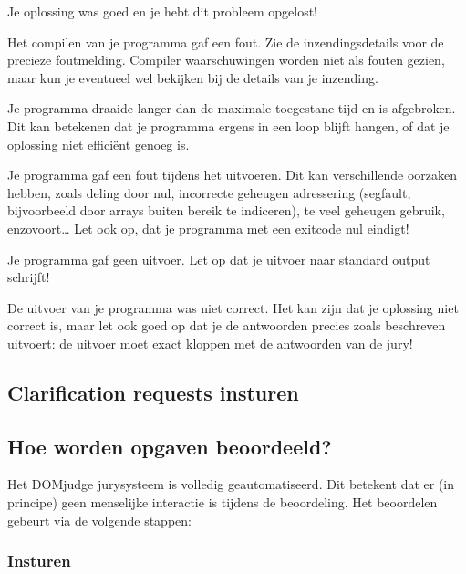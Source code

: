 \documentclass[11pt,titlepage,a4paper]{article}
\newcommand{\DOMjudge}{DOMjudge }
\begin{document}
\begin{description}[\setleftmargin{4.5cm}]
\item[CORRECT]
Je oplossing was goed en je hebt dit probleem opgelost!

\item[COMPILER-ERROR]
Het compilen van je programma gaf een fout. Zie de inzendingsdetails
voor de precieze foutmelding. Compiler waarschuwingen worden niet als
fouten gezien, maar kun je eventueel wel bekijken bij de details van
je inzending.

\item[TIMELIMIT]
Je programma draaide langer dan de maximale toegestane tijd en is
afgebroken. Dit kan betekenen dat je programma ergens in een loop
blijft hangen, of dat je oplossing niet effici\"ent genoeg is.

\item[RUN-ERROR]
Je programma gaf een fout tijdens het uitvoeren. Dit kan verschillende
oorzaken hebben, zoals deling door nul, incorrecte geheugen adressering
(segfault, bijvoorbeeld door arrays buiten bereik te indiceren), te
veel geheugen gebruik, enzovoort\dots
Let ook op, dat je programma met een exitcode nul eindigt!

\item[NO-OUTPUT]
Je programma gaf geen uitvoer. Let op dat je uitvoer naar standard
output schrijft!

\item[WRONG-ANSWER]
De uitvoer van je programma was niet correct. Het kan zijn dat je
oplossing niet correct is, maar let ook goed op dat je de antwoorden
precies zoals beschreven uitvoert: de uitvoer moet exact kloppen met
de antwoorden van de jury!

\end{description}


\subsection{Clarification requests insturen}


\subsection{Hoe worden opgaven beoordeeld?}

Het \DOMjudge jurysysteem is volledig geautomatiseerd. Dit betekent
dat er (in principe) geen menselijke interactie is tijdens de
beoordeling. Het beoordelen gebeurt via de volgende stappen:

\subsubsection{Insturen}
\end{document}
